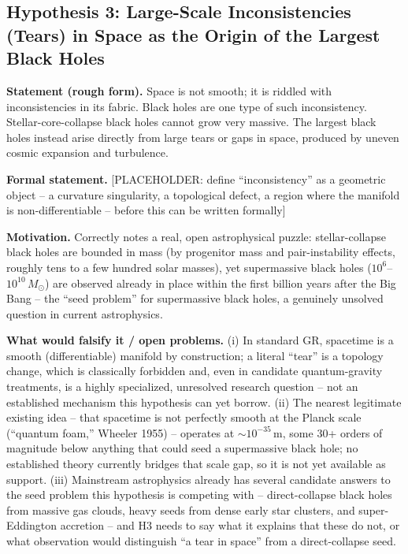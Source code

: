 \documentclass[12pt, a4paper]{article}
\begin{document}
\subsection{Hypothesis 3: Large-Scale Inconsistencies (Tears) in Space as the Origin of the Largest Black Holes}
\label{subsec:h3}
\textbf{Statement (rough form).} Space is not smooth; it is riddled
with inconsistencies in its fabric. Black holes are one type of such
inconsistency. Stellar-core-collapse black holes cannot grow very
massive. The largest black holes instead arise directly from large
tears or gaps in space, produced by uneven cosmic expansion and
turbulence.

\textbf{Formal statement.}
[PLACEHOLDER: define ``inconsistency'' as a geometric object --
a curvature singularity, a topological defect, a region where the
manifold is non-differentiable -- before this can be written formally]

\textbf{Motivation.} Correctly notes a real, open astrophysical
puzzle: stellar-collapse black holes are bounded in mass (by
progenitor mass and pair-instability effects, roughly tens to a few
hundred solar masses), yet supermassive black holes
($10^6$--$10^{10}\,M_\odot$) are observed already in place within the
first billion years after the Big Bang -- the ``seed problem'' for
supermassive black holes, a genuinely unsolved question in current
astrophysics.

\textbf{What would falsify it / open problems.}
(i) In standard GR, spacetime is a smooth (differentiable) manifold
by construction; a literal ``tear'' is a topology change, which is
classically forbidden and, even in candidate quantum-gravity
treatments, is a highly specialized, unresolved research question --
not an established mechanism this hypothesis can yet borrow. (ii) The
nearest legitimate existing idea -- that spacetime is not perfectly
smooth at the Planck scale (``quantum foam,'' Wheeler 1955) -- operates
at $\sim10^{-35}\,\mathrm{m}$, some 30+ orders of magnitude below
anything that could seed a supermassive black hole; no established
theory currently bridges that scale gap, so it is not yet available as
support. (iii) Mainstream astrophysics already has several candidate
answers to the seed problem this hypothesis is competing with --
direct-collapse black holes from massive gas clouds, heavy seeds from
dense early star clusters, and super-Eddington accretion -- and H3
needs to say what it explains that these do not, or what observation
would distinguish ``a tear in space'' from a direct-collapse seed.
\end{document}
